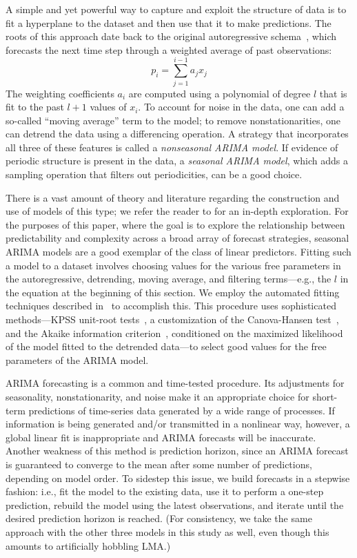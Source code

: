A simple and yet powerful way to capture and exploit the structure of
data is to fit a hyperplane to the dataset and then use that it to
make predictions.  The roots of this approach date back to the
original autoregressive schema~\cite{weigend93}, which forecasts the
next time step through a weighted average of past observations: $$p_i
= \sum_{j=1}^{i-1} a_j x_j$$ The weighting coefficients $a_i$ are
computed using a polynomial of degree $l$ that is fit to the past
$l+1$ values of $x_i$.  To account for noise in the data, one can add
a so-called ``moving average'' term to the model; to remove
nonstationarities, one can detrend the data using a differencing
operation.  A strategy that incorporates all three of these features
is called a \emph{nonseasonal ARIMA model}.  If evidence of periodic
structure is present in the data, a \emph{seasonal ARIMA model}, which
adds a sampling operation that filters out periodicities, can be a
good choice.

There is a vast amount of theory and literature regarding the
construction and use of models of this type; we refer the reader to
\cite{davislinearts} for an in-depth exploration.  For the purposes of
this paper, where the goal is to explore the relationship between
predictability and complexity across a broad array of forecast
strategies, seasonal ARIMA models are a good exemplar of the class of
linear predictors.  Fitting such a model to a dataset involves
choosing values for the various free parameters in the autoregressive,
detrending, moving average, and filtering terms---e.g., the $l$ in the
equation at the beginning of this section.  We employ the automated
fitting techniques described in~\cite{autoARIMA} to accomplish this.
This procedure uses sophisticated methods---KPSS unit-root
tests~\cite{KPSSunit}, a customization of the Canova-Hansen
test~\cite{Canova1995}, and the Akaike information
criterion~\cite{akaike1974}, conditioned on the maximized likelihood
of the model fitted to the detrended data---to select good values for
the free parameters of the ARIMA model.

ARIMA forecasting is a common and time-tested procedure.  Its
adjustments for seasonality, nonstationarity, and noise make it an
appropriate choice for short-term predictions of time-series data
generated by a wide range of processes.  If information is being
generated and/or transmitted in a nonlinear way, however, a global
linear fit is inappropriate and ARIMA forecasts will be inaccurate.
Another weakness of this method is prediction horizon, since an ARIMA
forecast is guaranteed to converge to the mean after some number of
predictions, depending on model order.  To sidestep this issue, we
build forecasts in a stepwise fashion: i.e., fit the model to the
existing data, use it to perform a one-step prediction, rebuild the
model using the latest observations, and iterate until the desired
prediction horizon is reached.  (For consistency, we take the same
approach with the other three models in this study as well, even
though this amounts to artificially hobbling LMA.)

